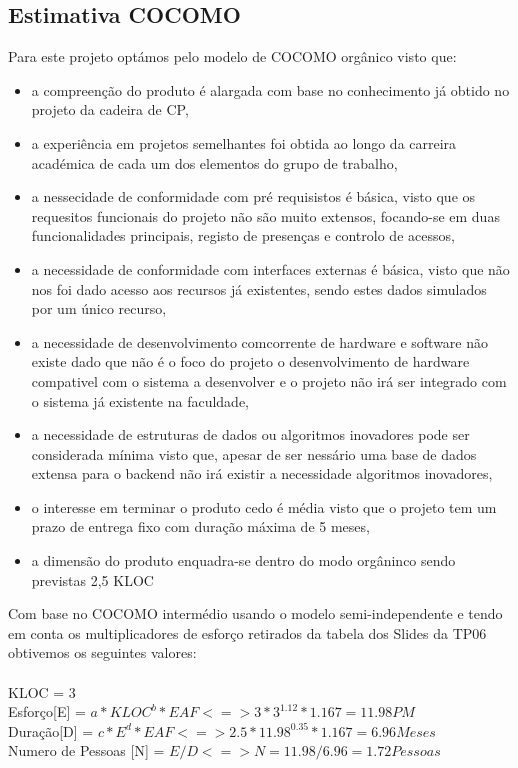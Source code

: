 \documentclass[a4paper]{report}
\begin{document}
\subsection{Estimativa COCOMO}
Para este projeto optámos pelo modelo de COCOMO orgânico visto que:
\begin{itemize}
\item a compreenção do produto é alargada com base no conhecimento já obtido no projeto da cadeira de CP, 
\item a experiência em projetos semelhantes foi obtida ao longo da carreira académica de cada um dos elementos do grupo de trabalho, 
\item a nessecidade de conformidade com pré requisistos é básica, visto que os requesitos funcionais do projeto não são muito extensos, focando-se em duas funcionalidades principais, registo de presenças e controlo de acessos,
\item a necessidade de conformidade com interfaces externas é básica, visto que não nos foi dado acesso aos recursos já existentes, sendo estes dados simulados por um único recurso,
\item a necessidade de desenvolvimento comcorrente de hardware e software não existe dado que não é o foco do projeto o desenvolvimento de hardware compativel com o sistema a desenvolver e o projeto não irá ser integrado com o sistema já existente na faculdade,
\item a necessidade de estruturas de dados ou algoritmos inovadores pode ser considerada mínima visto que, apesar de ser nessário uma base de dados extensa para o backend não irá existir a necessidade algoritmos inovadores,
\item o interesse em terminar o produto cedo é média visto que o projeto tem um prazo de entrega fixo com duração máxima de 5 meses,
\item a dimensão do produto enquadra-se dentro do modo orgâninco sendo previstas 2,5 KLOC
\end{itemize}
Com base no COCOMO intermédio usando o modelo semi-independente e tendo em conta os multiplicadores de esforço retirados da tabela dos Slides da TP06 \cite{slideTP6} obtivemos os seguintes valores:\\\\ KLOC = $3$ \\
Esforço[E] = $a * KLOC^{b} * EAF <=> 3 * 3^{1.12} * 1.167 = 11.98 PM$\\
Duração[D] = $c * E^{d} * EAF <=> 2.5 * 11.98^{0.35} * 1.167 = 6.96 Meses$\\
Numero de Pessoas [N] = $E / D <=> N = 11.98 / 6.96 = 1.72 Pessoas$
\end{document}
